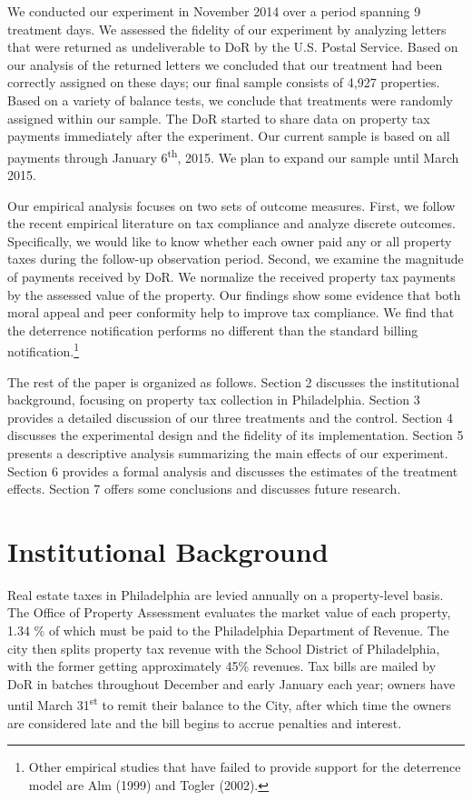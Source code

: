 \documentclass[12pt,titlepage]{article}
\begin{document}
We conducted our experiment in November 2014 over a period
spanning 9 treatment days.  We assessed the fidelity of our
experiment by analyzing letters that were returned as undeliverable to DoR by the
U.S. Postal Service. Based on our analysis of the returned letters we
concluded that our treatment had been correctly assigned on these
days; our final sample consists of 4,927 properties. Based on a
variety of balance tests, we conclude that treatments were randomly
assigned within our sample. The DoR started to share data on property
tax payments immediately after the experiment. Our current sample is
based on all payments through January 6\textsuperscript{th}, 2015. We plan to expand our
sample until March 2015.

Our empirical analysis focuses on two sets of outcome measures. First,
we follow the recent empirical literature on tax compliance and
analyze discrete outcomes. Specifically, we would like to know whether each
owner paid any or all property taxes during the follow-up observation period.
Second, we examine the magnitude of payments received by DoR. We
normalize the received property tax payments by the assessed value of
the property.  Our findings show some evidence that both
moral appeal and peer conformity help to improve tax compliance. We
find that the deterrence notification performs no different than the
standard billing notification.\footnote{Other empirical studies that have
  failed to provide support for the deterrence model are Alm (1999)
  and Togler (2002).}

The rest of the paper is organized as follows. Section 2 discusses the
institutional background, focusing on property tax collection in
Philadelphia.  Section 3 provides a detailed discussion of our three
treatments and the control. Section 4 discusses the experimental
design and the fidelity of its implementation. Section 5
presents a descriptive analysis summarizing the main effects of our experiment. 
Section 6 provides a formal analysis and discusses the estimates of the treatment
effects.  Section 7 offers some conclusions and discusses future research. 



\section{Institutional Background}

Real estate taxes in Philadelphia are levied annually on a
property-level basis.  The Office of Property Assessment evaluates the
market value of each property, 1.34 \% of which must be paid to the
Philadelphia Department of Revenue. The city then splits property tax
revenue with the School District of Philadelphia, with the former
getting approximately 45\% revenues.  Tax bills are mailed by DoR in
batches throughout December and early January each year; owners
have until March 31\textsuperscript{st} to remit their balance to the City, after which
time the owners are considered late and the bill begins to accrue penalties and interest.
\end{document}

